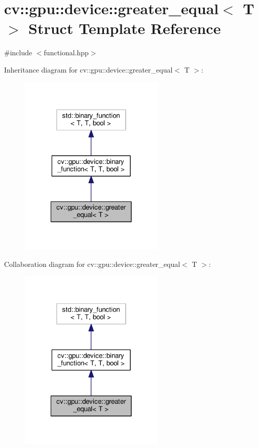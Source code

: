 \hypertarget{structcv_1_1gpu_1_1device_1_1greater__equal}{\section{cv\-:\-:gpu\-:\-:device\-:\-:greater\-\_\-equal$<$ T $>$ Struct Template Reference}
\label{structcv_1_1gpu_1_1device_1_1greater__equal}
}


{\ttfamily \#include $<$functional.\-hpp$>$}



Inheritance diagram for cv\-:\-:gpu\-:\-:device\-:\-:greater\-\_\-equal$<$ T $>$\-:\nopagebreak
\begin{figure}[H]
\begin{center}
\leavevmode
\includegraphics[width=198pt]{structcv_1_1gpu_1_1device_1_1greater__equal__inherit__graph}
\end{center}
\end{figure}


Collaboration diagram for cv\-:\-:gpu\-:\-:device\-:\-:greater\-\_\-equal$<$ T $>$\-:\nopagebreak
\begin{figure}[H]
\begin{center}
\leavevmode
\includegraphics[width=198pt]{structcv_1_1gpu_1_1device_1_1greater__equal__coll__graph}
\end{center}
\end{figure}
